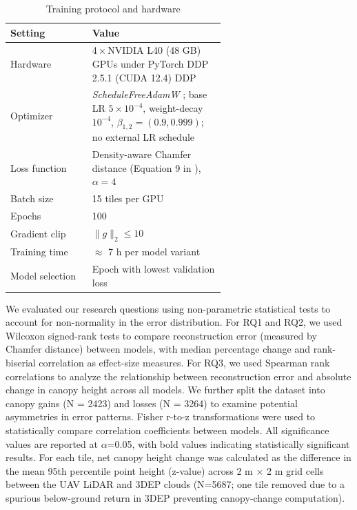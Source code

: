 \documentclass[remotesensing,article,accept,pdftex,moreauthors]{Definitions/mdpi}
\begin{document}
\begin{table}[htbp]
  \centering
  \caption{Training protocol and hardware}
  \label{tab:training_protocol}
  \begin{tabular}{lp{0.62\linewidth}}
    \toprule
    \textbf{Setting} & \textbf{Value} \\
    \midrule
    Hardware      & 4\,×\,NVIDIA L40 (48 GB) GPUs under PyTorch DDP 2.5.1 (CUDA 12.4)
 DDP \\
    Optimizer     & \textit{ScheduleFreeAdamW} \cite{defazio_road_2024}; base LR $5\times10^{-4}$, weight-decay $10^{-4}$, $\beta_{1,2}=(0.9,0.999)$; no external LR schedule \\
    Loss function & Density-aware Chamfer distance (Equation 9 in \cite{wu_density-aware_2021}), $\alpha=4$ \\
    Batch size    & 15 tiles per GPU \\
    Epochs        & 100 \\
    Gradient clip & $\lVert g\rVert_2 \le 10$ \\
    Training time & $\approx$ 7 h per model variant \\
    Model selection & Epoch with lowest validation loss \\
    \bottomrule
  \end{tabular}
\end{table}

\vspace{-3pt}

We evaluated our research questions using non-parametric statistical tests to account for non-normality in the error distribution. For RQ1 and RQ2, we used Wilcoxon signed-rank tests to compare reconstruction error (measured by Chamfer distance) between models, with median percentage change and rank-biserial correlation as effect-size measures. For RQ3, we used Spearman rank correlations to analyze the relationship between reconstruction error and absolute change in canopy height across all models. We further split the dataset into canopy gains (N = 2423) and losses (N = 3264) to examine potential asymmetries in error patterns. Fisher r-to-z transformations were used to statistically compare correlation coefficients between models. All significance values are reported at $\alpha$=0.05, with bold values indicating statistically significant results.
For each tile, net canopy height change was calculated as the difference in the mean 95th percentile point height (z-value) across 2 m × 2 m grid cells between the UAV LiDAR and 3DEP clouds (N=5687; one tile removed due to a spurious below-ground return in 3DEP preventing canopy-change computation).
\end{document}
